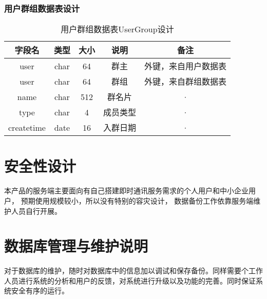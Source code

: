 \subsubsection{用户群组数据表设计}
\begin{table}[htbp]
	\centering
	\caption{用户群组数据表UserGroup设计} \label{tab:usergroup-database}
	\begin{tabular}{|c|c|c|c|c|}
		\hline
		字段名     & 类型 & 大小 & 说明     & 备注                 \\
		\hline
		user       & char & 64   & 群主     & 外键，来自用户数据表 \\
		\hline
		user       & char & 64   & 群组     & 外键，来自群组数据表 \\
		\hline
		name       & char & 512  & 群名片   & ·                    \\
        \hline
        type       & char & 4    & 成员类型 & ·                    \\
		\hline
		createtime & date & 16   & 入群日期 & ·                    \\
		\hline
	\end{tabular}
\end{table}



\section{安全性设计}
本产品的服务端主要面向有自己搭建即时通讯服务需求的个人用户和中小企业用户，
预期使用规模较小，所以没有特别的容灾设计，
数据备份工作依靠服务端维护人员自行开展。

\section{数据库管理与维护说明}
对于数据库的维护，随时对数据库中的信息加以调试和保存备份。同样需要个工作人员进行系统的分析和用户的反馈，对系统进行升级以及功能的完善。同时保证系统安全有序的运行。